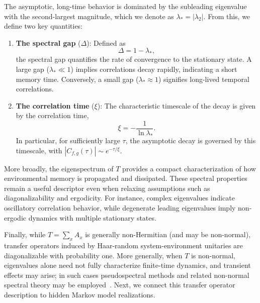 \documentclass[
    aps,
    prx,
    reprint,
    superscriptaddress,
    longbibliography,
    nofootinbib,
    floatfix,
]{revtex4-2}
\begin{document}
The asymptotic, long-time behavior is dominated by the subleading eigenvalue with the second-largest magnitude, which we denote as \(\lambda_* = |\lambda_2|\). From this, we define two key quantities:
\begin{enumerate}
    \item \textbf{The spectral gap} (\(\Delta\)): Defined as 
    \begin{equation}
        \Delta = 1 - \lambda_*,
    \end{equation}
    the spectral gap quantifies the rate of convergence to the stationary state. A large gap (\(\lambda_* \ll 1\)) implies correlations decay rapidly, indicating a short memory time. Conversely, a small gap (\(\lambda_* \approx 1\)) signifies long-lived temporal correlations.
    \item \textbf{The correlation time} (\(\xi\)): The characteristic timescale of the decay is given by the correlation time,
    \begin{equation}
        \xi = -\frac{1}{\ln \lambda_*}.
    \end{equation}
    In particular, for sufficiently large \(\tau\), the asymptotic decay is governed by this timescale, with \(|C_{f,g}(\tau)| \sim e^{-\tau/\xi}\).
\end{enumerate}
More broadly, the eigenspectrum of \(T\) provides a compact characterization of how environmental memory is propagated and dissipated. These spectral properties remain a useful descriptor even when relaxing assumptions such as diagonalizability and ergodicity. For instance, complex eigenvalues indicate oscillatory correlation behavior, while degenerate leading eigenvalues imply non-ergodic dynamics with multiple stationary states.

Finally, while \(T=\sum_x A_x\) is generally non-Hermitian (and may be non-normal), transfer operators induced by Haar-random system-environment unitaries are diagonalizable with probability one. More generally, when \(T\) is non-normal, eigenvalues alone need not fully characterize finite-time dynamics, and transient effects may arise; in such cases pseudospectral methods and related non-normal spectral theory may be employed~\cite{trefethenSpectraPseudospectraBehavior2005}. Next, we connect this transfer operator description to hidden Markov model realizations.
\end{document}
